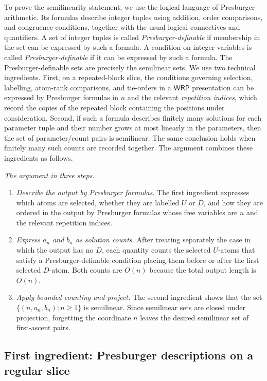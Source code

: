 \documentclass[11pt]{article}
\theoremstyle{definition}
\newcommand{\WRP}{\mathsf{WRP}}
\begin{document}
To prove the semilinearity statement, we use the logical language of
Presburger arithmetic.  Its formulas describe integer tuples using addition,
order comparisons, and congruence conditions, together with the usual logical
connectives and quantifiers.  A set of integer tuples is called
\emph{Presburger-definable} if membership in the set can be expressed by such a
formula.  A condition on integer variables is called
\emph{Presburger-definable} if it can be expressed by such a formula.  The
Presburger-definable sets are precisely the semilinear sets.  We
use two technical ingredients.  First, on a repeated-block slice, the
conditions governing selection, labelling, atom-rank comparisons, and
tie-orders in a $\WRP$ presentation can be expressed by Presburger formulas in
$n$ and the relevant \emph{repetition indices}, which record the copies of the
repeated block containing the positions under consideration.  Second, if such a
formula describes finitely many solutions for each parameter tuple and their
number grows at most linearly in the parameters, then the set of
parameter/count pairs is semilinear.  The same conclusion holds when finitely
many such counts are recorded together.  The argument combines these
ingredients as follows.

\vspace{0.5em}
\noindent\emph{The argument in three steps.}
\begin{enumerate}[label=(\arabic*)]
\item \emph{Describe the output by Presburger formulas.}  The first ingredient
expresses which atoms are selected, whether they are labelled $U$ or $D$, and
how they are ordered in the output by Presburger formulas whose free variables
are $n$ and the relevant repetition indices.
\item \emph{Express $a_n$ and $b_n$ as solution counts.}  After treating
separately the case in which the output has no $D$, each quantity counts the
selected $U$-atoms that satisfy a Presburger-definable condition placing them
before or after the first selected $D$-atom.  Both counts are $O(n)$ because
the total output length is $O(n)$.
\item \emph{Apply bounded counting and project.}  The second ingredient shows
that the set $\{(n,a_n,b_n):n\ge 1\}$ is semilinear.  Since semilinear sets are
closed under projection, forgetting the coordinate $n$ leaves the desired
semilinear set of first-ascent pairs.
\end{enumerate}

\subsection{First ingredient: Presburger descriptions on a regular slice}
\end{document}
